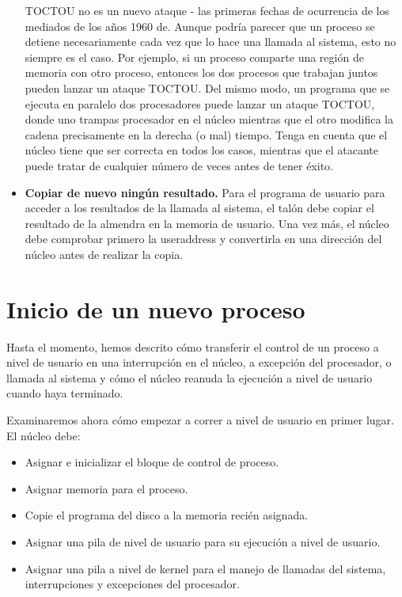 \documentclass[10pt]{book}
\begin{document}
\begin{itemize}
TOCTOU no es un nuevo ataque - las primeras fechas de ocurrencia de los mediados de los años 1960 de. Aunque podría parecer que un proceso se detiene necesariamente cada vez que lo hace una llamada al sistema, esto no siempre es el caso. Por ejemplo, si un proceso comparte una región de memoria con otro proceso, entonces los dos procesos que trabajan juntos pueden lanzar un ataque TOCTOU. Del mismo modo, un programa que se ejecuta en paralelo dos procesadores puede lanzar un ataque TOCTOU, donde uno trampas procesador en el núcleo mientras que el otro modifica la cadena precisamente en la derecha (o mal) tiempo. Tenga en cuenta que el núcleo tiene que ser correcta en todos los casos, mientras que el atacante puede tratar de cualquier número de veces antes de tener éxito.

\item \textbf{Copiar de nuevo ningún resultado.} Para el programa de usuario para acceder a los resultados de la llamada al sistema, el talón debe copiar el resultado de la almendra en la memoria de usuario. Una vez más, el núcleo debe comprobar primero la useraddress y convertirla en una dirección del núcleo antes de realizar la copia.
\end{itemize}

\section{Inicio de un nuevo proceso}

Hasta el momento, hemos descrito cómo transferir el control de un proceso a nivel de usuario en una interrupción en el núcleo, a excepción del procesador, o llamada al sistema y cómo el núcleo reanuda la ejecución a nivel de usuario cuando haya terminado.

Examinaremos ahora cómo empezar a correr a nivel de usuario en primer lugar. El núcleo debe:
\begin{itemize}
\item Asignar e inicializar el bloque de control de proceso.
\item Asignar memoria para el proceso.
\item Copie el programa del disco a la memoria recién asignada.
\item Asignar una pila de nivel de usuario para su ejecución a nivel de usuario.
\item Asignar una pila a nivel de kernel para el manejo de llamadas del sistema, interrupciones y excepciones del procesador.
\end{itemize}
\end{document}
